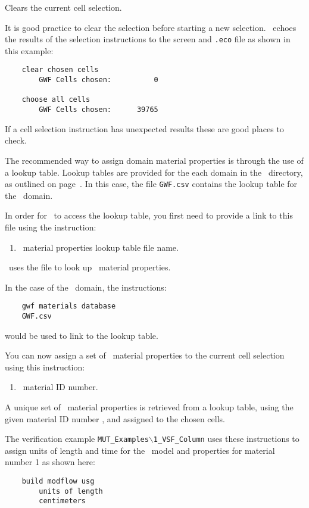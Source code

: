 {
    {Clears the current cell selection.
     }

It is good practice to clear the selection before starting a new selection. \mut\ echoes the results of the selection instructions to the screen and \texttt{.eco} file as shown in this example:
\begin{verbatim}
    clear chosen cells
    	GWF Cells chosen:          0

    choose all cells
    	GWF Cells chosen:      39765
\end{verbatim}
If a cell selection instruction has unexpected results these are good places to check.

The recommended way to assign domain material properties is through the use of a lookup table.  Lookup tables are provided for the each domain in the \bin\ directory, as outlined on page~\pageref{page:userbin}. In this case, the file \texttt{GWF.csv} contains the lookup table for the \gwf\ domain.

In order for \mut\ to access the lookup table, you first need to provide a link to this file using the instruction:

    {
        \squish
        \begin{enumerate}
        \item {}  \gwf\ material properties lookup table file name.
        \end{enumerate}
          \mut\ uses the file  to look up \gwf\ material properties.
    }

In the case of the \gwf\ domain, the instructions:
\begin{verbatim}
    gwf materials database
    GWF.csv
\end{verbatim}
would be used to link to the lookup table.

You can now assign a set of \gwf\ material properties to the current cell selection using this instruction:

    {
        \squish
        \begin{enumerate}
        \item {}  \gwf\ material ID number.
        \end{enumerate}
          A unique set of \gwf\ material properties is retrieved from a lookup table, using the given  material ID number , and assigned to the chosen cells.
    }

The verification example \texttt{MUT\_Examples$\backslash$1\_VSF\_Column} uses these instructions to assign units of length and time for the \mfus\ model and properties for material number 1 as shown here:
\begin{verbatim}
    build modflow usg
        units of length
        centimeters


\end{verbatim}}
